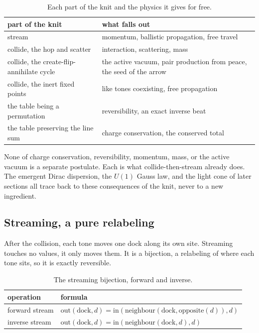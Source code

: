 \begin{table}[ht]
\centering
\begin{tabular}{@{}ll@{}}
\toprule
part of the knit & what falls out \\
\midrule
stream & momentum, ballistic propagation, free travel \\
collide, the hop and scatter & interaction, scattering, mass \\
collide, the create-flip-annihilate cycle & the active vacuum, pair production from peace, the seed of the arrow \\
collide, the inert fixed points & like tones coexisting, free propagation \\
the table being a permutation & reversibility, an exact inverse beat \\
the table preserving the line sum & charge conservation, the conserved total \\
\bottomrule
\end{tabular}
\caption{Each part of the knit and the physics it gives for free.}
\label{tab:falls-out}
\end{table}

\begin{result}
None of charge conservation, reversibility, momentum, mass, or the active vacuum is a separate postulate. Each is what collide-then-stream already does. The emergent Dirac dispersion, the $U(1)$ Gauss law, and the light cone of later sections all trace back to these consequences of the knit, never to a new ingredient.
\end{result}

\subsection{Streaming, a pure relabeling}

After the collision, each tone moves one dock along its own site. Streaming touches no values, it only moves them. It is a bijection, a relabeling of where each tone sits, so it is exactly reversible.

\begin{table}[ht]
\centering
\begin{tabular}{@{}ll@{}}
\toprule
operation & formula \\
\midrule
forward stream & $\mathrm{out}(\mathrm{dock}, d) = \mathrm{in}(\mathrm{neighbour}(\mathrm{dock}, \mathrm{opposite}(d)), d)$ \\
inverse stream & $\mathrm{out}(\mathrm{dock}, d) = \mathrm{in}(\mathrm{neighbour}(\mathrm{dock}, d), d)$ \\
\bottomrule
\end{tabular}
\caption{The streaming bijection, forward and inverse.}
\label{tab:streaming}
\end{table}

